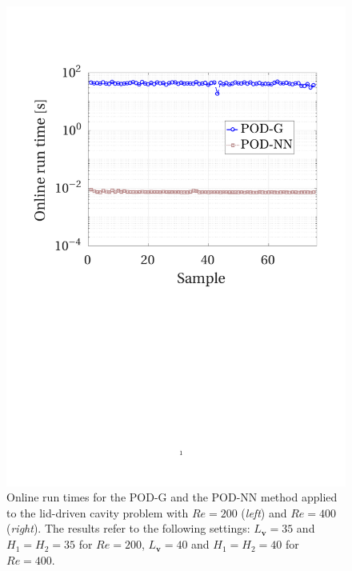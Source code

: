 \documentclass[12pt, a4paper, twoside, openright]{report}
\numberwithin{equation}{chapter}
\theoremstyle{theorem}
\theoremstyle{definition}
\theoremstyle{remark}
\theoremstyle{proposition}
\numberwithin{figure}{chapter}
\newcommand{\bg}[1]{\boldsymbol{#1}}
\begin{document}
\begin{figure}[H]
			\includegraphics[scale = 0.43, trim = {1.5cm 9cm 1.5cm 3.5cm}, clip]{dc_400_time}
			
			\caption{Online run times for the POD-G and the POD-NN method applied to the lid-driven cavity problem with $Re = 200$ (\emph{left}) and $Re = 400$ (\emph{right}). The results refer to the following settings: $L_{\bg{v}} = 35$ and $H_1 = H_2 = 35$ for $Re = 200$, $L_{\bg{v}} = 40$ and $H_1 = H_2 = 40$ for $Re = 400$.}
			\label{}
		\end{figure}
		\fi
		
\end{document}
